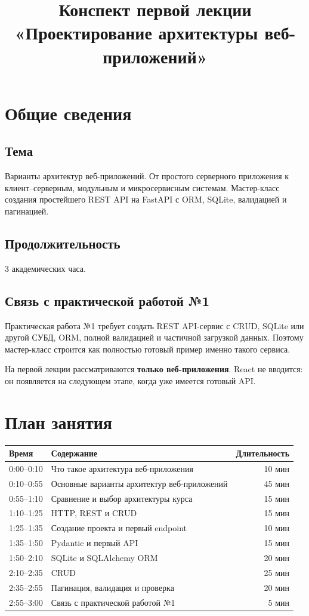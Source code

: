 \documentclass[12pt,a4paper]{article}
\title{Конспект первой лекции\\\large «Проектирование архитектуры веб-приложений»}
\date{}
\begin{document}
\maketitle
\tableofcontents
\newpage

\section{Общие сведения}
\subsection{Тема}
Варианты архитектур веб-приложений. От простого серверного приложения к клиент--серверным, модульным и микросервисным системам. Мастер-класс создания простейшего REST API на FastAPI с ORM, SQLite, валидацией и пагинацией.

\subsection{Продолжительность}
3 академических часа.

\subsection{Связь с практической работой №1}
Практическая работа №1 требует создать REST API-сервис с CRUD, SQLite или другой СУБД, ORM, полной валидацией и частичной загрузкой данных. Поэтому мастер-класс строится как полностью готовый пример именно такого сервиса.

На первой лекции рассматриваются \textbf{только веб-приложения}. React не вводится: он появляется на следующем этапе, когда уже имеется готовый API.

\section{План занятия}
\begin{tabularx}{\textwidth}{@{}lXr@{}}
\toprule
Время & Содержание & Длительность\\
\midrule
0:00--0:10 & Что такое архитектура веб-приложения & 10 мин\\
0:10--0:55 & Основные варианты архитектур веб-приложений & 45 мин\\
0:55--1:10 & Сравнение и выбор архитектуры курса & 15 мин\\
1:10--1:25 & HTTP, REST и CRUD & 15 мин\\
1:25--1:35 & Создание проекта и первый endpoint & 10 мин\\
1:35--1:50 & Pydantic и первый API & 15 мин\\
1:50--2:10 & SQLite и SQLAlchemy ORM & 20 мин\\
2:10--2:35 & CRUD & 25 мин\\
2:35--2:55 & Пагинация, валидация и проверка & 20 мин\\
2:55--3:00 & Связь с практической работой №1 & 5 мин\\
\bottomrule
\end{tabularx}
\end{document}
